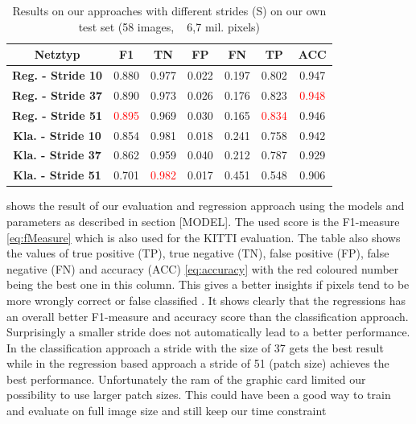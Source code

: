 \begin{table}[]
	\begin{center}
		\begin{tabular}{c|cccccc}
			\toprule
			\textbf{Netztyp} & {\bf F1} & \textbf{TN} & \textbf{FP} & \textbf{FN} & \textbf{TP} & \textbf{ACC} \\
			\midrule
			\textbf{Reg. - Stride 10} & 0.880 & 0.977 & 0.022 & 0.197 & 0.802 & 0.947\\
			\textbf{Reg. - Stride 37} & 0.890 & 0.973 & 0.026 & 0.176 & 0.823 &  \textcolor{red}{0.948}\\ 
			\textbf{Reg. - Stride 51} & \textcolor{red}{0.895} & 0.969 & 0.030 & 0.165 & \textcolor{red}{0.834} & 0.946\\
			\midrule
			\textbf{Kla. - Stride 10} & 0.854 & 0.981 & 0.018 & 0.241 & 0.758 & 0.942\\
			\textbf{Kla. - Stride 37} & 0.862 & 0.959 & 0.040 & 0.212 & 0.787 & 0.929\\
			\textbf{Kla. - Stride 51} & 0.701 & \textcolor{red}{0.982} & 0.017 & 0.451 & 0.548 & 0.906\\
			\bottomrule
		\end{tabular}
		\caption{Results on our approaches with different strides (S) on our own test set (58 images, ~ 6,7 mil. pixels)}
		\label{tab:ownapproach}
	\end{center}
\end{table}

 shows the result of our evaluation and regression approach using the models and parameters as described in section [MODEL]. The used score is the F1-measure \ref{eq:fMeasure} which is also used for the KITTI evaluation.
The table also shows the values of true positive (TP), true negative (TN), false positive (FP), false negative (FN) and accuracy (ACC) \ref{eq:accuracy} with the red coloured number being the best one in this column. This gives a better insights if pixels tend to be more wrongly correct or false classified . It shows clearly that the regressions has an overall better F1-measure and accuracy score than the classification approach. Surprisingly a smaller stride does not automatically lead to a better performance. In the classification approach a stride with the size of 37 gets the best result while in the regression based approach a stride of 51 (patch size) achieves the best performance. Unfortunately the ram of the graphic card limited our possibility to use larger patch sizes. This could have been a good way to train and evaluate on full image size and still keep our time constraint\\

